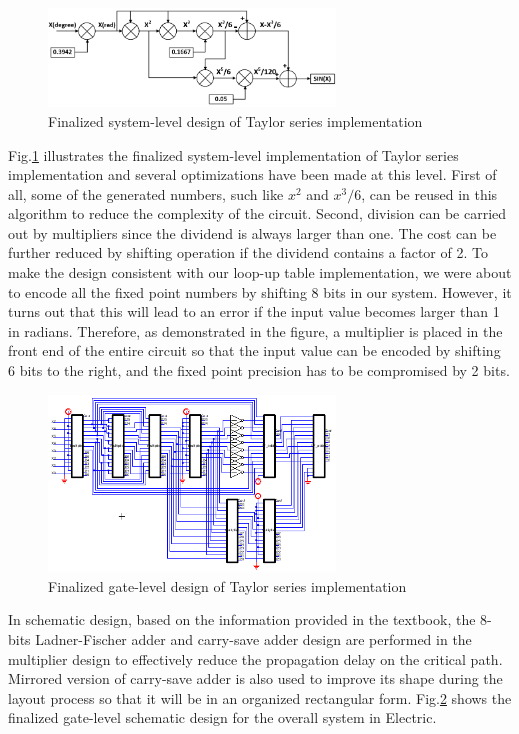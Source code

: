 \documentclass[10pt,journal]{IEEEtran}
\begin{document}
\begin{figure}[h]
\centering
\includegraphics[width=3in]{finalized_design.png}
\caption{Finalized system-level design of Taylor series implementation}
\label{finalized_design}
\end{figure}

Fig.\ref{finalized_design} illustrates the finalized system-level implementation of Taylor series implementation and several optimizations have been made at this level. First of all, some of the generated numbers, such like $x^2$ and $x^3/6$, can be reused in this algorithm to reduce the complexity of the circuit. Second, division can be carried out by multipliers since the dividend is always larger than one. The cost can be further reduced by shifting operation if the dividend contains a factor of 2. To make the design consistent with our loop-up table implementation, we were about to encode all the fixed point numbers by shifting 8 bits in our system. However, it turns out that this will lead to an error if the input value becomes larger than 1 in radians. Therefore, as demonstrated in the figure, a multiplier is placed in the front end of the entire circuit so that the input value can be encoded by shifting 6 bits to the right, and the fixed point precision has to be compromised by 2 bits.

\begin{figure}[h]
\centering
\includegraphics[width=3in]{finalized_gate_design.png}
\caption{Finalized gate-level design of Taylor series implementation}
\label{finalized_gate_design}
\end{figure}

In schematic design, based on the information provided in the textbook, the 8-bits Ladner-Fischer adder and carry-save adder design are performed in the multiplier design to effectively reduce the propagation delay on the critical path. Mirrored version of carry-save adder is also used to improve its shape during the layout process so that it will be in an organized rectangular form. Fig.\ref{finalized_gate_design} shows the finalized gate-level schematic design for the overall system in Electric.
\end{document}
